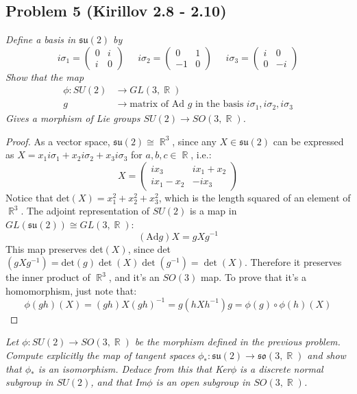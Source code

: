 \documentclass[12 pt]{article}
\DeclareMathOperator {\R} {\mathbb{R}}
\begin{document}
\subsection*{Problem 5 (Kirillov 2.8 - 2.10)}
\emph{Define a basis in $\mathfrak{su}(2)$ by}
\[     i\sigma_1 = \left(  \begin{array} {cc}  0 & i \\ i & 0   \end{array} \right)  \;\;\;\;\; i\sigma_2 = \left(  \begin{array} {cc}  0 & 1 \\ -1 & 0   \end{array} \right)  \;\;\;\;\;  i\sigma_3 = \left(  \begin{array} {cc}  i &0 \\ 0 & -i   \end{array} \right) \]
\emph{Show that the map}
\begin{align*}       \phi: SU(2) &\to GL(3,\R)     \\
g &\to \text{matrix of Ad } g \text{ in the basis } i\sigma_1, i \sigma_2, i\sigma_3
\end{align*}
\emph{Gives a morphism of Lie groups $SU(2) \to SO(3,\R)$.}

\begin{proof}
As a vector space, $\mathfrak{su}(2) \cong \R^3$, since any $X\in \mathfrak{su}(2)$ can be expressed as $X = x_1 i\sigma_1 + x_2 i\sigma_2 + x_3 i\sigma_3$ for $a,b,c\in \R$, i.e.:
\[       X =  \left( \begin{array} {cc}  ix_3 & ix_1 + x_2 \\ ix_1 - x_2 & -ix_3  \end{array}  \right)      \]
Notice that det$(X) = x_1^2 + x_2^2 + x_3^2$, which is the length squared of an element of $\R^3$. The adjoint representation of $SU(2)$ is a map in $GL(\mathfrak{su}(2)) \cong GL(3,\R)$:
\[    (\text{Ad}g) X = gXg^{-1}  \]
This map preserves det$(X)$, since det$(gXg^{-1}) = \text{det}(g) \det(X) \det(g^{-1}) = \det(X)$. Therefore it preserves the inner product of $\R^3$, and it's an $SO(3)$ map. To prove that it's a homomorphism, just note that:
\[     \phi(gh) (X) = (gh) X (gh)^{-1} = g (hXh^{-1}) g = \phi(g) \circ \phi(h) (X)    \]
\end{proof}

\emph{Let $\phi: SU(2) \to SO(3,\R)$ be the morphism deﬁned in the previous problem. Compute explicitly the map of tangent spaces $\phi_* : \mathfrak{su}(2) \to
\mathfrak{so}(3,\R)$ and show that $\phi_*$ is an isomorphism. Deduce from this that Ker$\phi$ is a discrete normal subgroup in $SU(2)$, and that Im$\phi$ is an open subgroup in $SO(3,\R)$.}
\end{document}
